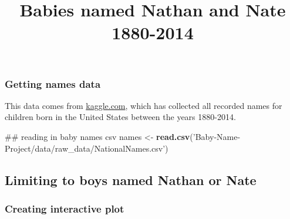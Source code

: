 \documentclass[]{article}
\title{Babies named Nathan and Nate 1880-2014}
\author{}
\date{}
\newenvironment{Shaded}{\begin{snugshade}}{\end{snugshade}}
\newcommand{\KeywordTok}[1]{\textcolor[rgb]{0.13,0.29,0.53}{\textbf{#1}}}
\newcommand{\StringTok}[1]{\textcolor[rgb]{0.31,0.60,0.02}{#1}}
\newcommand{\OperatorTok}[1]{\textcolor[rgb]{0.81,0.36,0.00}{\textbf{#1}}}
\newcommand{\NormalTok}[1]{#1}
\begin{document}
\maketitle

\subsubsection{Getting names data}\label{getting-names-data}

This data comes from
\href{https://www.kaggle.com/kaggle/us-baby-names}{kaggle.com}, which
has collected all recorded names for children born in the United States
between the years 1880-2014.

\begin{Shaded}
\begin{Highlighting}[]
\NormalTok{## reading in baby names csv}
\NormalTok{names <-}\StringTok{ }\KeywordTok{read.csv}\NormalTok{(}\StringTok{'Baby-Name-Project/data/raw_data/NationalNames.csv'}\NormalTok{)}
\end{Highlighting}
\end{Shaded}

\subsection{Limiting to boys named Nathan or
Nate}\label{limiting-to-boys-named-nathan-or-nate}

\begin{Shaded}
\end{Shaded}

\subsubsection{Creating interactive
plot}\label{creating-interactive-plot}
\end{document}

